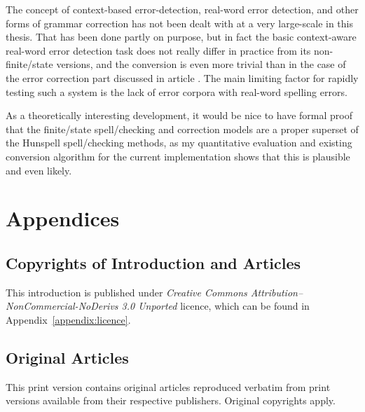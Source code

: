 \documentclass[officiallayout,final]{unihelcompling}
\newif\ifprintversion
\begin{document}
The concept of context-based error-detection, real-word error detection, and
other forms of grammar correction has not been dealt with at a very large-scale
in this thesis. That has been done partly on purpose, but in fact the basic
context-aware real-word error detection task does not really differ in practice
from its non-finite\-/state versions, and the conversion is even more trivial
than in the case of the error correction part discussed in article
. The main limiting factor for rapidly testing
such a system is the lack of error corpora with real-word spelling errors.

As a theoretically interesting development, it would be nice to have formal
proof that the finite\-/state spell\-/checking and correction models are a
proper superset of the Hunspell spell\-/checking methods, as my quantitative
evaluation and existing conversion algorithm for the current implementation
shows that this is plausible and even likely.






\appendix
\chapter{Appendices}
\section{Copyrights of Introduction and Articles}
\label{appendix:copyrights}

This introduction is published under \emph{Creative Commons
Attribution–NonCommercial-NoDerivs 3.0 Unported} licence, which can be found in
Appendix~\ref{appendix:licence}. 
\ifprintversion
The articles included
in this print version, reproduced without changes from their originals are
copyrighted property of their respective publishers.
\fi

\section{Original Articles}
\label{appendix:articles}

\ifprintversion
This print version contains original articles reproduced verbatim from print
versions available from their respective publishers. Original copyrights apply.











\end{document}
